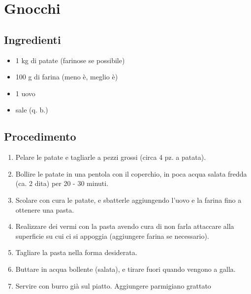 \section{Gnocchi}
\subsection{Ingredienti}
\begin{itemize}
\item 1 kg di patate (farinose se possibile)  
\item 100 g di farina (meno è, meglio è)  
\item 1 uovo  
\item sale (q. b.) 
\end{itemize}
\subsection{Procedimento}
\begin{enumerate}
\item  Pelare le patate e tagliarle a pezzi grossi (circa 4 pz. a patata).  
\item  Bollire le patate in una pentola con il coperchio, in poca acqua salata fredda (ca. 2 dita) per 20 - 30 minuti. 
\item  Scolare con cura le patate, e sbatterle aggiungendo l'uovo e la farina fino a ottenere una pasta.  
\item  Realizzare dei vermi con la pasta avendo cura di non farla attaccare alla superficie su cui ci si appoggia (aggiungere farina se necessario).  
\item  Tagliare la pasta nella forma desiderata.
\item  Buttare in acqua bollente (salata), e tirare fuori quando vengono a galla.
\item  Servire con burro già sul piatto. Aggiungere parmigiano grattato
\end{enumerate}
